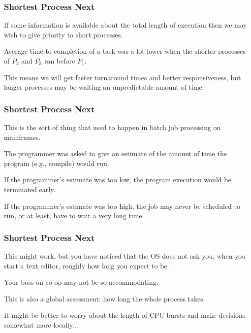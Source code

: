 \begin{frame}
\frametitle{Shortest Process Next}

If some information is available about the total length of execution then we may wish to give priority to short processes. 


Average time to completion of a task was a lot lower when the shorter processes of $P_{2}$ and $P_{3}$ ran before $P_{1}$. 

This means we will get faster turnaround times and better responsiveness, but longer processes may be waiting an unpredictable amount of time.

\end{frame}

\begin{frame}
\frametitle{Shortest Process Next}

This is the sort of thing that used to happen in batch job processing on mainframes. 

The programmer was asked to give an estimate of the amount of time the program (e.g., compile) would run. 

If the programmer's estimate was too low, the program execution would be terminated early. 

If the programmer's estimate was too high, the job may never be scheduled to run, or at least, have to wait a very long time. 


\end{frame}

\begin{frame}
\frametitle{Shortest Process Next}


This might work, but you have noticed that the OS does not ask you, when you start a text editor, roughly how long you expect to be. 

Your boss on co-op may not be so accommodating. 

This is also a global assessment: how long the whole process takes. 

It might be better to worry about the length of CPU bursts and make decisions somewhat more locally...


\end{frame}


